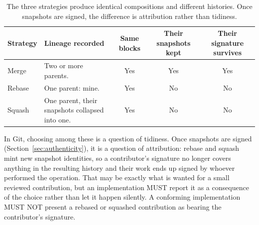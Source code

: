 \documentclass[11pt,a4paper]{article}
\begin{document}
\begin{table}[htbp]
\centering
\caption{The three strategies produce identical compositions and different
histories. Once snapshots are signed, the difference is attribution rather than
tidiness.}
\label{tab:strategies}
\begin{tabularx}{\textwidth}{lYccc}
\toprule
\textbf{Strategy} & \textbf{Lineage recorded} & \textbf{Same blocks} &
\textbf{Their snapshots kept} & \textbf{Their signature survives} \\
\midrule
Merge  & Two or more parents.                            & Yes & Yes & Yes \\
Rebase & One parent: mine.                               & Yes & No  & No  \\
Squash & One parent, their snapshots collapsed into one. & Yes & No  & No  \\
\bottomrule
\end{tabularx}
\end{table}

In Git, choosing among these is a question of tidiness. Once snapshots are
signed (Section~\ref{sec:authenticity}), it is a question of attribution: rebase
and squash mint new snapshot identities, so a contributor's signature no longer
covers anything in the resulting history and their work ends up signed by
whoever performed the operation. That may be exactly what is wanted for a small
reviewed contribution, but an implementation MUST report it as a consequence of
the choice rather than let it happen silently. A conforming implementation MUST
NOT present a rebased or squashed contribution as bearing the contributor's
signature.
\end{document}
